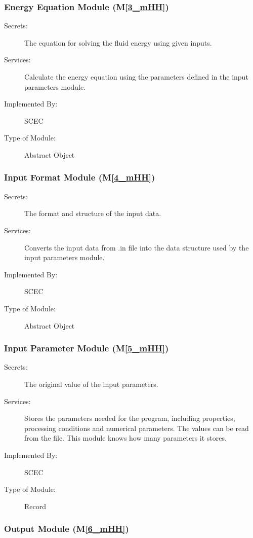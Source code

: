 \documentclass[12pt, titlepage]{article}
\newcommand{\mref}[1]{M\ref{#1}}
\begin{document}
\subsubsection{Energy Equation Module (\mref{3_mHH})}

\begin{description}
\item[Secrets:] The equation for solving the fluid energy using given inputs. 
\item[Services:] Calculate the energy equation using the parameters defined in the input parameters module.  
\item[Implemented By:] SCEC
\item[Type of Module:] Abstract Object
\end{description}


\subsubsection{Input Format Module (\mref{4_mHH})}

\begin{description}
\item[Secrets:]The format and structure of the input data.
\item[Services:]Converts the input data from .in file into the data structure used by the
  input parameters module.
\item[Implemented By:] SCEC
\item[Type of Module:] Abstract Object
\end{description}

\subsubsection{Input Parameter Module (\mref{5_mHH})}

\begin{description}
\item[Secrets:] The original value of the input parameters. 
\item[Services:] Stores the parameters needed for the program, including properties, processing conditions and numerical parameters. The values can be read from the file. This module knows how many parameters it stores. 
\item[Implemented By:] SCEC
\item[Type of Module:] Record
\end{description}

\subsubsection{Output Module (\mref{6_mHH})}
\end{document}
